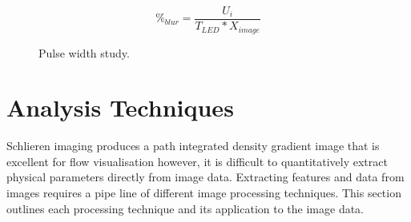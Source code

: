 \begin{equation} \label{eqn:blur}
\%_{blur} = \frac{U_i}{T_{LED}*X_{image}}
\end{equation}
\begin{figure}[H]
  \centering
  \hfill
  \caption{Pulse width study.}
  \label{fig:pulse}
\end{figure}



\newpage

\section{Analysis Techniques} \label{sect:post}

Schlieren imaging produces a path integrated density gradient image that is excellent for flow visualisation however, it is difficult to quantitatively extract physical parameters directly from image data. Extracting features and data from images requires a pipe line of different image processing techniques. This section outlines each processing technique and its application to the image data.

